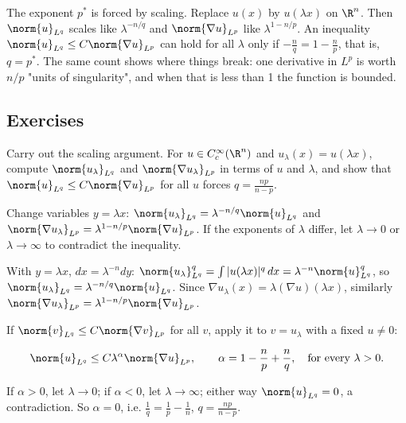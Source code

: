 The exponent $p^*$ is forced by scaling. Replace $u(x)$ by $u(\lambda x)$ on $\R^n$. Then $\norm{u}_{L^q}$ scales like $\lambda^{-n/q}$ and $\norm{\nabla u}_{L^p}$ like $\lambda^{1-n/p}$. An inequality $\norm{u}_{L^q}\le C\norm{\nabla u}_{L^p}$ can hold for all $\lambda$ only if $-\frac nq = 1 - \frac np$, that is, $q = p^*$. The same count shows where things break: one derivative in $L^p$ is worth $n/p$ "units of singularity", and when that is less than 1 the function is bounded.

\subsection*{Exercises}

\begin{exercise}
  Carry out the scaling argument. For $u \in C_c^\infty(\R^n)$ and $u_\lambda(x) = u(\lambda x)$, compute $\norm{u_\lambda}_{L^q}$ and $\norm{\nabla u_\lambda}_{L^p}$ in terms of $u$ and $\lambda$, and show that $\norm{u}_{L^q} \le C\norm{\nabla u}_{L^p}$ for all $u$ forces $q = \frac{np}{n-p}$.
  \begin{hint}
    Change variables $y = \lambda x$: $\norm{u_\lambda}_{L^q} = \lambda^{-n/q}\norm{u}_{L^q}$ and $\norm{\nabla u_\lambda}_{L^p} = \lambda^{1-n/p}\norm{\nabla u}_{L^p}$. If the exponents of $\lambda$ differ, let $\lambda \to 0$ or $\lambda \to \infty$ to contradict the inequality.
  \end{hint}
  \begin{solution}
    With $y = \lambda x$, $dx = \lambda^{-n}dy$: $\norm{u_\lambda}_{L^q}^q = \int|u(\lambda x)|^q\,dx = \lambda^{-n}\norm{u}_{L^q}^q$, so $\norm{u_\lambda}_{L^q} = \lambda^{-n/q}\norm{u}_{L^q}$. Since $\nabla u_\lambda(x) = \lambda(\nabla u)(\lambda x)$, similarly $\norm{\nabla u_\lambda}_{L^p} = \lambda^{1-n/p}\norm{\nabla u}_{L^p}$.

    If $\norm{v}_{L^q} \le C\norm{\nabla v}_{L^p}$ for all $v$, apply it to $v = u_\lambda$ with a fixed $u \ne 0$:

    \[ \norm{u}_{L^q} \le C\lambda^{\alpha}\norm{\nabla u}_{L^p}, \qquad \alpha = 1 - \frac np + \frac nq, \quad\text{for every }\lambda > 0. \]

    If $\alpha > 0$, let $\lambda \to 0$; if $\alpha < 0$, let $\lambda \to \infty$; either way $\norm{u}_{L^q} = 0$, a contradiction. So $\alpha = 0$, i.e. $\frac1q = \frac1p - \frac1n$, $q = \frac{np}{n-p}$.
  \end{solution}
\end{exercise}

